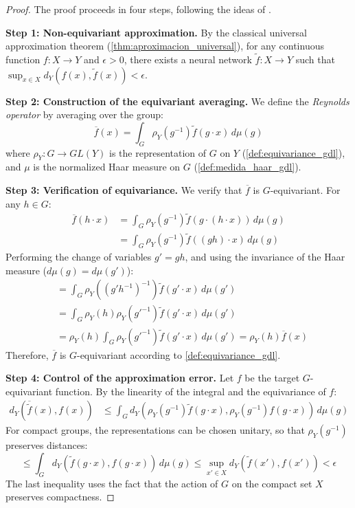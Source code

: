 \begin{proof}
The proof proceeds in four steps, following the ideas of \citet{yarotsky2022}.

\textbf{Step 1: Non-equivariant approximation.}
By the classical universal approximation theorem (\autoref{thm:aproximacion_universal}), for any continuous function $f: X \to Y$ and $\epsilon > 0$, there exists a neural network $\tilde{f}: X \to Y$ such that $\sup_{x \in X} d_Y(f(x), \tilde{f}(x)) < \epsilon$.

\textbf{Step 2: Construction of the equivariant averaging.}
We define the \textit{Reynolds operator} by averaging over the group:
\[
\overline{f}(x) = \int_G \rho_Y(g^{-1}) \tilde{f}(g \cdot x) \, d\mu(g)
\]
where $\rho_Y: G \to GL(Y)$ is the representation of $G$ on $Y$ (\autoref{def:equivariance_gdl}), and $\mu$ is the normalized Haar measure on $G$ (\autoref{def:medida_haar_gdl}).

\textbf{Step 3: Verification of equivariance.}
We verify that $\overline{f}$ is $G$-equivariant. For any $h \in G$:
\begin{align*}
\overline{f}(h \cdot x) &= \int_G \rho_Y(g^{-1}) \tilde{f}(g \cdot (h \cdot x)) \, d\mu(g) \\
&= \int_G \rho_Y(g^{-1}) \tilde{f}((gh) \cdot x) \, d\mu(g)
\end{align*}
Performing the change of variables $g' = gh$, and using the invariance of the Haar measure ($d\mu(g) = d\mu(g')$):
\begin{align*}
&= \int_G \rho_Y((g'h^{-1})^{-1}) \tilde{f}(g' \cdot x) \, d\mu(g') \\
&= \int_G \rho_Y(h)\rho_Y(g'^{-1}) \tilde{f}(g' \cdot x) \, d\mu(g') \\
&= \rho_Y(h) \int_G \rho_Y(g'^{-1}) \tilde{f}(g' \cdot x) \, d\mu(g') = \rho_Y(h) \overline{f}(x)
\end{align*}
Therefore, $\overline{f}$ is $G$-equivariant according to \autoref{def:equivariance_gdl}.

\textbf{Step 4: Control of the approximation error.}
Let $f$ be the target $G$-equivariant function. By the linearity of the integral and the equivariance of $f$:
\begin{align*}
d_Y(\overline{\tilde{f}}(x), f(x)) &\leq \int_G d_Y(\rho_Y(g^{-1}) \tilde{f}(g \cdot x), \rho_Y(g^{-1}) f(g \cdot x)) \, d\mu(g)
\end{align*}
For compact groups, the representations can be chosen unitary, so that $\rho_Y(g^{-1})$ preserves distances:
\[
\leq \int_G d_Y(\tilde{f}(g \cdot x), f(g \cdot x)) \, d\mu(g) \leq \sup_{x' \in X} d_Y(\tilde{f}(x'), f(x')) < \epsilon
\]
The last inequality uses the fact that the action of $G$ on the compact set $X$ preserves compactness.
\end{proof}

